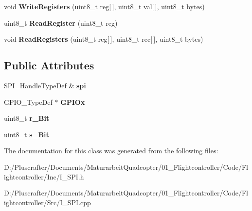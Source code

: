 \begin{DoxyCompactItemize}
\mbox{\label{class_interface_1_1_i___s_p_i_ae265b1d2ba8bda18174b670ae30c9d4e}} 
void {\bfseries Write\+Registers} (uint8\+\_\+t reg\mbox{[}$\,$\mbox{]}, uint8\+\_\+t val\mbox{[}$\,$\mbox{]}, uint8\+\_\+t bytes)
\item 
\mbox{\label{class_interface_1_1_i___s_p_i_a11106cef4e7614c65b88c1f885d38e96}} 
uint8\+\_\+t {\bfseries Read\+Register} (uint8\+\_\+t reg)
\item 
\mbox{\label{class_interface_1_1_i___s_p_i_ac2ffd8435e629f8d12a4287da9728b2e}} 
void {\bfseries Read\+Registers} (uint8\+\_\+t reg\mbox{[}$\,$\mbox{]}, uint8\+\_\+t rec\mbox{[}$\,$\mbox{]}, uint8\+\_\+t bytes)
\end{DoxyCompactItemize}
\subsection*{Public Attributes}
\begin{DoxyCompactItemize}
\item 
\mbox{\label{class_interface_1_1_i___s_p_i_a0be454a2782b5ecbcc6e08a20a8a28e9}} 
S\+P\+I\+\_\+\+Handle\+Type\+Def \& {\bfseries spi}
\item 
\mbox{\label{class_interface_1_1_i___s_p_i_ae85ceec2c946c77fa97124b2274dbcb0}} 
G\+P\+I\+O\+\_\+\+Type\+Def $\ast$ {\bfseries G\+P\+I\+Ox}
\item 
\mbox{\label{class_interface_1_1_i___s_p_i_abfa0f664f69477085b19599bf195e636}} 
uint8\+\_\+t {\bfseries r\+\_\+\+Bit}
\item 
\mbox{\label{class_interface_1_1_i___s_p_i_ac574d7e0b257cee5afc6b951774bff60}} 
uint8\+\_\+t {\bfseries s\+\_\+\+Bit}
\end{DoxyCompactItemize}


The documentation for this class was generated from the following files\+:\begin{DoxyCompactItemize}
\item 
D\+:/\+Pluscrafter/\+Documents/\+Maturarbeit\+Quadcopter/01\+\_\+\+Flightcontroller/\+Code/\+Flightcontroller/\+Inc/I\+\_\+\+S\+P\+I.\+h\item 
D\+:/\+Pluscrafter/\+Documents/\+Maturarbeit\+Quadcopter/01\+\_\+\+Flightcontroller/\+Code/\+Flightcontroller/\+Src/I\+\_\+\+S\+P\+I.\+cpp\end{DoxyCompactItemize}
